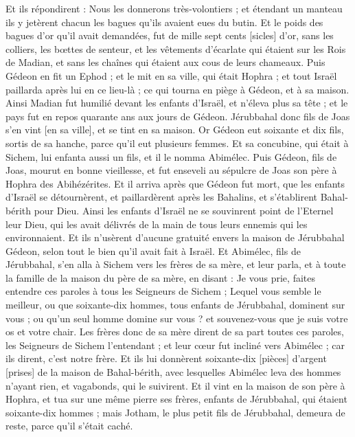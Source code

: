 \begin{multicols}{2}
Et ils répondirent : Nous les donnerons très-volontiers ; et étendant un manteau ils y jetèrent chacun les bagues qu'ils avaient eues du butin.
Et le poids des bagues d'or qu'il avait demandées, fut de mille sept cents [sicles] d'or, sans les colliers, les bœttes de senteur, et les vêtements d'écarlate qui étaient sur les Rois de Madian, et sans les chaînes qui étaient aux cous de leurs chameaux.
Puis Gédeon en fit un Ephod ; et le mit en sa ville, qui était Hophra ; et tout Israël paillarda après lui en ce lieu-là ; ce qui tourna en piège à Gédeon, et à sa maison.
Ainsi Madian fut humilié devant les enfants d'Israël, et n'éleva plus sa tête ; et le pays fut en repos quarante ans aux jours de Gédeon.
Jérubbahal donc fils de Joas s'en vint [en sa ville], et se tint en sa maison.
Or Gédeon eut soixante et dix fils, sortis de sa hanche, parce qu'il eut plusieurs femmes.
Et sa concubine, qui était à Sichem, lui enfanta aussi un fils, et il le nomma Abimélec.
Puis Gédeon, fils de Joas, mourut en bonne vieillesse, et fut enseveli au sépulcre de Joas son père à Hophra des Abihézérites.
Et il arriva après que Gédeon fut mort, que les enfants d'Israël se détournèrent, et paillardèrent après les Bahalins, et s'établirent Bahal-bérith pour Dieu.
Ainsi les enfants d'Israël ne se souvinrent point de l'Eternel leur Dieu, qui les avait délivrés de la main de tous leurs ennemis qui les environnaient.
Et ils n'usèrent d'aucune gratuité envers la maison de Jérubbahal Gédeon, selon tout le bien qu'il avait fait à Israël.
\VerseOne{}Et Abimélec, fils de Jérubbahal, s'en alla à Sichem vers les frères de sa mère, et leur parla, et à toute la famille de la maison du père de sa mère, en disant :
Je vous prie, faites entendre ces paroles à tous les Seigneurs de Sichem ; Lequel vous semble le meilleur, ou que soixante-dix hommes, tous enfants de Jérubbahal, dominent sur vous ; ou qu'un seul homme domine sur vous ? et souvenez-vous que je suis votre os et votre chair.
Les frères donc de sa mère dirent de sa part toutes ces paroles, les Seigneurs de Sichem l'entendant ; et leur cœur fut incliné vers Abimélec ; car ils dirent, c'est notre frère.
Et ils lui donnèrent soixante-dix [pièces] d'argent [prises] de la maison de Bahal-bérith, avec lesquelles Abimélec leva des hommes n'ayant rien, et vagabonds, qui le suivirent.
Et il vint en la maison de son père à Hophra, et tua sur une même pierre ses frères, enfants de Jérubbahal, qui étaient soixante-dix hommes ; mais Jotham, le plus petit fils de Jérubbahal, demeura de reste, parce qu'il s'était caché.

\end{multicols}
